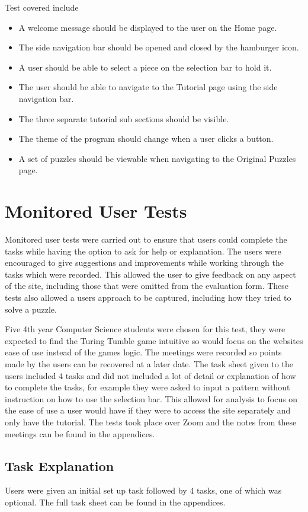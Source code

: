 \documentclass{l4proj}
\begin{document}
Test covered include 
\begin{itemize}
    \item A welcome message should be displayed to the user on the Home page.
    \item The side navigation bar should be opened and closed by the hamburger icon.
    \item A user should be able to select a piece on the selection bar to hold it.
    \item The user should be able to navigate to the Tutorial page using the side navigation bar.
    \item The three separate tutorial sub sections should be visible.
    \item The theme of the program should change when a user clicks a button.
    \item A set of puzzles should be viewable when navigating to the Original Puzzles page.
\end{itemize}

\section{Monitored User Tests}
Monitored user tests were carried out to ensure that users could complete the tasks while having the option to ask for help or explanation. The users were encouraged to give suggestions and improvements while working through the tasks which were recorded. This allowed the user to give feedback on any aspect of the site, including those that were omitted from the evaluation form. These tests also allowed a users approach to be captured, including how they tried to solve a puzzle. 

Five 4th year Computer Science students were chosen for this test, they were expected to find the Turing Tumble game intuitive so would focus on the websites ease of use instead of the games logic. The meetings were recorded so points made by the users can be recovered at a later date. The task sheet given to the users included 4 tasks and did not included a lot of detail or explanation of how to complete the tasks, for example they were asked to input a pattern without instruction on how to use the selection bar. This allowed for analysis to focus on the ease of use a user would have if they were to access the site separately and only have the tutorial. The tests took place over Zoom and the notes from these meetings can be found in the appendices.

\subsection{Task Explanation}
\label{taskExplanation}
Users were given an initial set up task followed by 4 tasks, one of which was optional. The full task sheet can be found in the appendices. 
\end{document}
